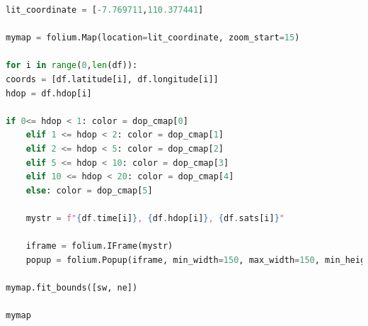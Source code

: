 \vspace{0.3cm}
\begin{lstlisting}[language=python, style=mystyle, caption={\textit{Plot} Nilai HDOP di Setiap Titik Menggunakan Pustaka Folium}, label={lst: 3-plot-hdop}]
lit_coordinate = [-7.769711,110.377441]

mymap = folium.Map(location=lit_coordinate, zoom_start=15)

for i in range(0,len(df)):
coords = [df.latitude[i], df.longitude[i]]
hdop = df.hdop[i]

if 0<= hdop < 1: color = dop_cmap[0]
	elif 1 <= hdop < 2: color = dop_cmap[1]
	elif 2 <= hdop < 5: color = dop_cmap[2]
	elif 5 <= hdop < 10: color = dop_cmap[3]
	elif 10 <= hdop < 20: color = dop_cmap[4]
	else: color = dop_cmap[5]
	
	mystr = f"{df.time[i]}, {df.hdop[i]}, {df.sats[i]}"
	
	iframe = folium.IFrame(mystr)
	popup = folium.Popup(iframe, min_width=150, max_width=150, min_height=300, max_height=300)

mymap.fit_bounds([sw, ne]) 

mymap
\end{lstlisting}